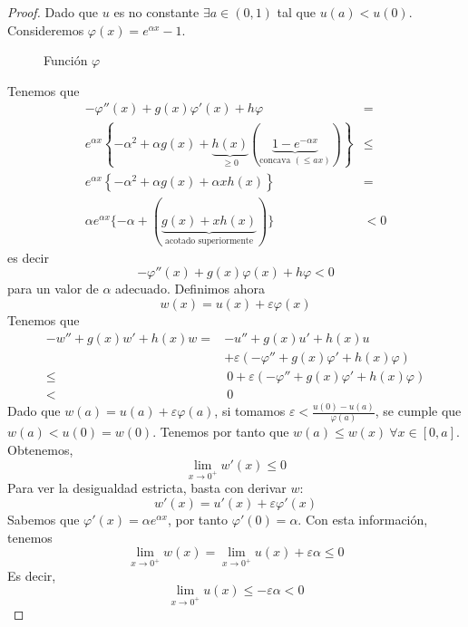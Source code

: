 \begin{proof}
Dado que $u$ es no constante $\exists a\in (0,1)$ tal que $u(a) < u(0)$.
Consideremos $\varphi(x) = e^{\alpha x}-1$. 

\begin{figure}[h]
\centering


\label{fig:phi2-x}
\caption{Función $\varphi$}
\end{figure}

Tenemos que
\begin{align*}
-\varphi''(x)+g(x)\varphi'(x)+h\varphi & = \\
e^{\alpha x}\left\{-\alpha^2 +\alpha g(x)+\underbrace{h(x)}_{\ge 0}\left(\underbrace{1-e^{-\alpha x}}_{\text{concava }(\le ax)}\right)\right\} & \le\\
e^{\alpha x}\left\{-\alpha^2+\alpha g(x) + \alpha xh(x)\right\} & = \\
\alpha e^{\alpha x}\{-\alpha + \left(\underbrace{g(x) +xh(x)}_{\text{acotado superiormente}}\right)\} & < 0
\end{align*}
es decir
$$-\varphi''(x)+g(x)\varphi(x)+h\varphi < 0$$
para un valor de $\alpha$ adecuado. Definimos ahora
$$w(x) = u(x) +\varepsilon \varphi(x)$$
Tenemos que
\begin{align*}
-w'' + g(x)w'+h(x)w = & -u''+g(x)u'+h(x)u\\
& + \varepsilon\left(-\varphi''+g(x)\varphi'+h(x)\varphi\right)\\
\le &\ 0 + \varepsilon\left(-\varphi''+g(x)\varphi'+h(x)\varphi\right)\\
< &\ 0
\end{align*}
Dado que $w(a) = u(a) + \varepsilon\varphi(a)$, si tomamos $\varepsilon < \frac{u(0)-u(a)}{\varphi(a)}$, se cumple que $w(a) < u(0) = w(0)$.
Tenemos por tanto que $w(a) \le w(x)\ \forall x \in [0, a]$. Obtenemos, $$\lim_{x\to0^+}w'(x) \le 0$$
Para ver la desigualdad estricta, basta con derivar $w$:
$$w'(x) = u'(x) +\varepsilon\varphi'(x)$$
Sabemos que $\varphi'(x) = \alpha e^{\alpha x}$, por tanto $\varphi'(0) = \alpha$.
Con esta información, tenemos
$$\lim_{x\to0^+} w(x) = \lim_{x\to0^+} u(x) +\varepsilon \alpha \le 0$$
Es decir, $$\lim_{x\to0^+} u(x) \le -\varepsilon \alpha < 0$$
\end{proof}

